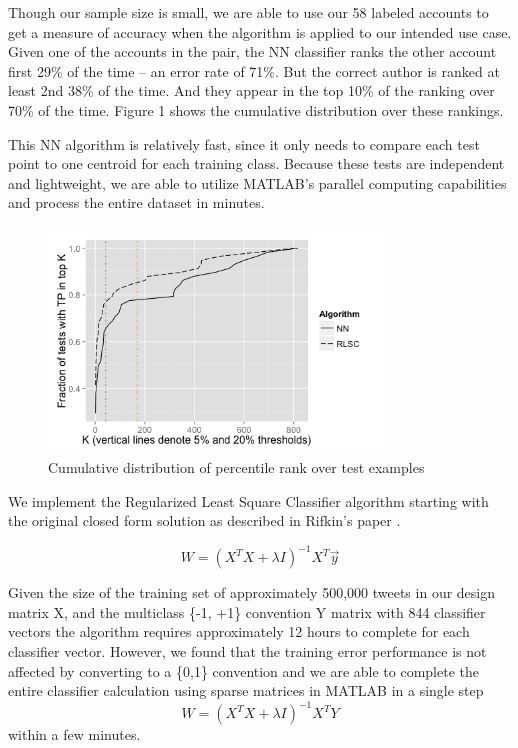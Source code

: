 \documentclass[10pt, conference, compsocconf]{IEEEtran}
\begin{document}
Though our sample size is small, we are able to use our 58 labeled
accounts to get a measure of accuracy when the algorithm is applied to
our intended use case. Given one of the accounts in the pair, the NN
classifier ranks the other account first 29\% of the time -- an error
rate of 71\%. But the correct author is ranked at least 2nd 38\% of
the time. And they appear in the top 10\% of the ranking over 70\%
of the time. Figure 1 shows the cumulative distribution over these
rankings.

This NN algorithm is relatively fast, since it only needs to compare
each test point to one centroid for each training class. Because these
tests are independent and lightweight, we are able to utilize MATLAB's
parallel computing capabilities and process the entire dataset in
minutes.

\begin{figure}[!t]
\centering
\includegraphics[width=3.5in]{resultcdf.png}
\caption{Cumulative distribution of percentile rank over test examples}
\label{fig_sim}
\end{figure}

We implement the Regularized Least Square Classifier algorithm starting with the original closed form solution as described in Rifkin's paper \cite{Rifkin}.  

$$W=(X^T X+\lambda I)^{-1} X^T \vec{y}$$


Given the size of the training set of approximately 500,000 tweets in
our design matrix X, and the multiclass \{-1, +1\} convention Y matrix
with 844 classifier vectors the algorithm requires approximately 12
hours to complete for each classifier vector.  However, we found that
the training error performance is not affected by converting to a
\{0,1\} convention and we are able to complete the entire classifier
calculation using sparse matrices in MATLAB in a single step $$W=(X^T
X+\lambda I)^{-1} X^T Y$$ within a few minutes.
\end{document}
